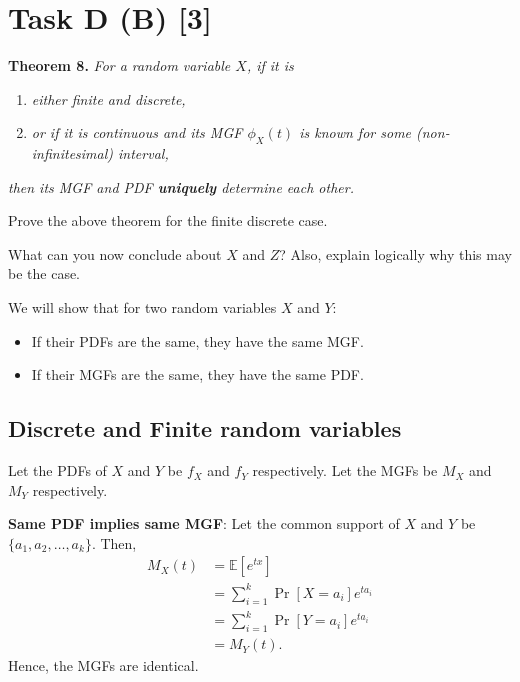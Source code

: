 \section*{\colS{$\S$} Task D (B) \hfill \normalfont \large [3]}

\begin{tcolorbox}
    \vspace{10pt}
    \begin{mdframed}[backgroundcolor=lightyellow, linecolor=darkyellow,
    linewidth=1.5pt]
        \textbf{Theorem 8.}
        \textit{For a random variable $X$, if it is}

        \begin{enumerate}
            \item \textit{either finite and discrete,}
            \item \textit{or if it is continuous and its MGF $\phi_X(t)$ is known
            for some (non-infinitesimal) interval,}
        \end{enumerate}

        \textit{then its MGF and PDF \textbf{uniquely} determine each other.}
    \end{mdframed}

    Prove the above theorem for the finite discrete case.
    
    What can you now conclude about $X$ and $Z$? Also, explain logically why this
    may be the case.
\end{tcolorbox}


We will show that for two random variables $X$ and $Y$:
\begin{itemize}
    \item If their PDFs are the same, they have the same MGF.
    \item If their MGFs are the same, they have the same PDF. 
\end{itemize}

\subsection*{Discrete and Finite random variables}

Let the PDFs of $X$ and $Y$ be $f_X$ and $f_Y$ respectively. Let the MGFs be
$M_X$ and $M_Y$ respectively.

\medskip\noindent\textbf{Same PDF implies same MGF}: Let the common support of
$X$ and $Y$ be $\{a_1, a_2, \ldots, a_k\}$. Then,
\begin{equation*}
    \begin{aligned}
        M_X(t) &= \mathbb{E}[e^{tx}] \\
        &= \sum_{i=1}^{k}\Pr[X=a_i]e^{ta_i} \\
        &= \sum_{i=1}^{k}\Pr[Y=a_i]e^{ta_i} \\
        &= M_Y(t).
    \end{aligned}
\end{equation*}
Hence, the MGFs are identical.

